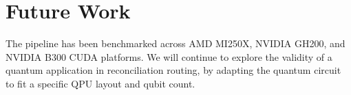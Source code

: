 \documentclass[journal]{IEEEtran}
\begin{document}

\section{Future Work}
The pipeline has been benchmarked across AMD MI250X, NVIDIA GH200, and NVIDIA B300 CUDA platforms. We will continue to explore the validity of a quantum application in reconciliation routing, by adapting the quantum circuit to fit a specific QPU layout and qubit count.



\end{document}
